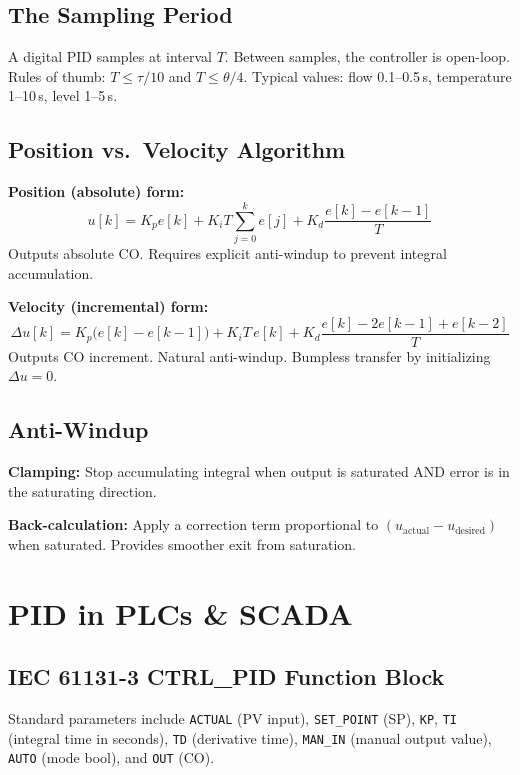 \documentclass[12pt,twoside,openright]{memoir}
\newcommand{\param}[1]{\texttt{#1}}
\begin{document}
\section{The Sampling Period}

A digital PID samples at interval $T$. Between samples, the controller is open-loop. Rules of thumb: $T \leq \tau/10$ and $T \leq \theta/4$. Typical values: flow 0.1--0.5\,s, temperature 1--10\,s, level 1--5\,s.

\section{Position vs.\ Velocity Algorithm}

\textbf{Position (absolute) form:}
\[
u[k] = K_p e[k] + K_i T \sum_{j=0}^{k} e[j] + K_d \frac{e[k]-e[k-1]}{T}
\]
Outputs absolute CO. Requires explicit anti-windup to prevent integral accumulation.

\textbf{Velocity (incremental) form:}
\[
\Delta u[k] = K_p\bigl(e[k]-e[k-1]\bigr) + K_i T \, e[k] + K_d \frac{e[k]-2e[k-1]+e[k-2]}{T}
\]
Outputs CO increment. Natural anti-windup. Bumpless transfer by initializing $\Delta u = 0$.

\section{Anti-Windup}

\textbf{Clamping:} Stop accumulating integral when output is saturated AND error is in the saturating direction.

\textbf{Back-calculation:} Apply a correction term proportional to $(u_\text{actual} - u_\text{desired})$ when saturated. Provides smoother exit from saturation.

\chapter{PID in PLCs \& SCADA}

\section{IEC 61131-3 CTRL\_PID Function Block}

Standard parameters include \param{ACTUAL} (PV input), \param{SET\_POINT} (SP), \param{KP}, \param{TI} (integral time in seconds), \param{TD} (derivative time), \param{MAN\_IN} (manual output value), \param{AUTO} (mode bool), and \param{OUT} (CO).
\end{document}
